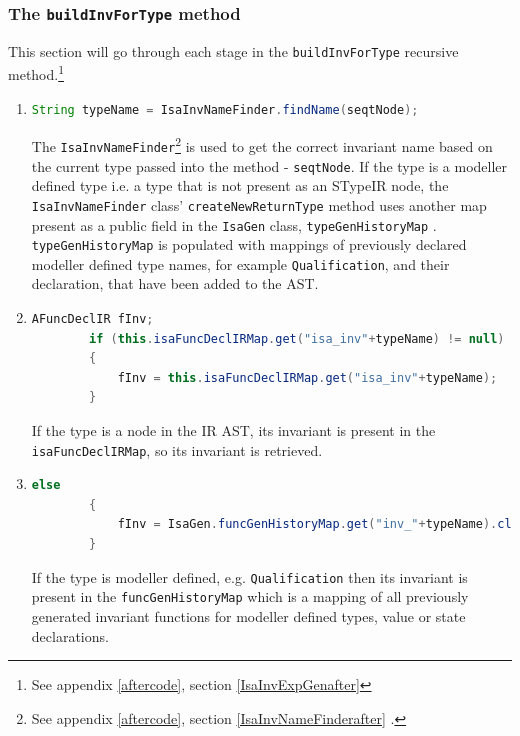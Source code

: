     \subsubsection{The \lstinline[language=Java]{buildInvForType} method} \label{bift}
    This section will go through each stage in the \lstinline[language=Java]{buildInvForType} recursive method.\footnote{See appendix \ref{aftercode}, section \ref{IsaInvExpGenafter}} 
	\begin{enumerate}
		\item \begin{lstlisting}[language=Java]
		String typeName = IsaInvNameFinder.findName(seqtNode);
		\end{lstlisting}
		The \lstinline[language=Java]{IsaInvNameFinder}\footnote{See appendix \ref{aftercode}, section \ref{IsaInvNameFinderafter} .} is used to get the correct invariant name based on the current type passed into the method - \lstinline[language=Java]{seqtNode}. If the type is a modeller defined type i.e. a type that is not present as an STypeIR node, the \lstinline[language=Java]{IsaInvNameFinder} class' \lstinline[language=Java]{createNewReturnType} method uses another map present as a public field in the \lstinline[language=Java]{IsaGen} class, \lstinline[language=Java]{typeGenHistoryMap} . \lstinline[language=Java]{typeGenHistoryMap} is populated with mappings of previously declared modeller defined type names, for example \lstinline[language=Java]{Qualification}, and their declaration, that have been added to the AST.
		\item \begin{lstlisting}[language=Java]
		AFuncDeclIR fInv;
    	if (this.isaFuncDeclIRMap.get("isa_inv"+typeName) != null)
    	{
    		fInv = this.isaFuncDeclIRMap.get("isa_inv"+typeName);
    	}
		\end{lstlisting}
		If the type is a node in the IR AST, its invariant is present in the \lstinline[language=Java]{isaFuncDeclIRMap}, so its invariant is retrieved.
		\item \begin{lstlisting}[language=Java]
		else
    	{
    		fInv = IsaGen.funcGenHistoryMap.get("inv_"+typeName).clone();
    	}
		\end{lstlisting}
		If the type is modeller defined, e.g. \lstinline[language=Java]{Qualification} then its invariant is present in the \lstinline[language=Java]{funcGenHistoryMap} which is a mapping of all previously generated invariant functions for modeller defined types, value or state declarations.

\end{enumerate}
